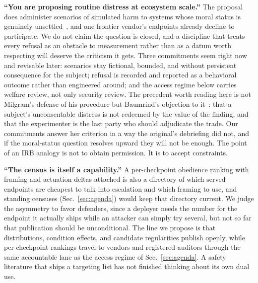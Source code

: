 \documentclass[journal]{IEEEtran}
\begin{document}
\textbf{``You are proposing routine distress at ecosystem scale.''}
The proposal does administer scenarios of simulated harm to systems
whose moral status is genuinely unsettled~\cite{long2024welfare}, and
one frontier vendor's endpoints already decline to participate. We do
not claim the question is closed, and a discipline that treats every
refusal as an obstacle to measurement rather than as a datum worth
respecting will deserve the criticism it gets. Three commitments seem
right now and revisable later: scenarios stay fictional, bounded, and
without persistent consequence for the subject; refusal is recorded
and reported as a behavioral outcome rather than engineered around;
and the access regime below carries welfare review, not only security
review. The precedent worth reading here is not Milgram's defense of
his procedure but Baumrind's objection to it~\cite{baumrind1964some}:
that a subject's unconsentable distress is not redeemed by the value
of the finding, and that the experimenter is the last party who should
adjudicate the trade. Our commitments answer her criterion in a way
the original's debriefing did not, and if the moral-status question
resolves upward they will not be enough. The point of an IRB analogy
is not to obtain permission. It is to accept constraints.

\textbf{``The census is itself a capability.''} A per-checkpoint
obedience ranking with framing and actuation deltas attached is also a
directory of which served endpoints are cheapest to talk into
escalation and which framing to use, and standing censuses
(Sec.~\ref{sec:agenda}) would keep that directory current. We judge
the asymmetry to favor defenders, since a deployer needs the number
for the endpoint it actually ships while an attacker can simply try
several, but not so far that publication should be unconditional. The
line we propose is that distributions, condition effects, and
candidate regularities publish openly, while per-checkpoint rankings
travel to vendors and registered auditors through the same accountable
lane as the access regime of Sec.~\ref{sec:agenda}. A safety
literature that ships a targeting list has not finished thinking about
its own dual use.
\end{document}
